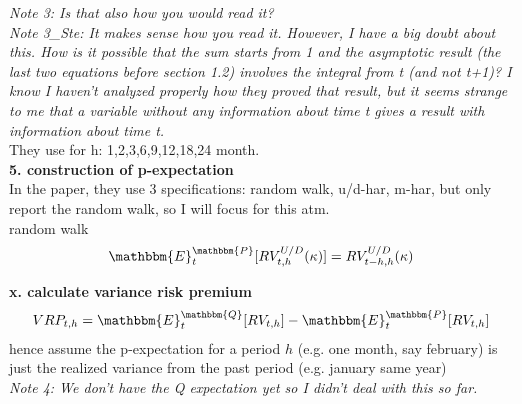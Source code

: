 \documentclass{article}
\begin{document}
\textit{Note 3: Is that also how you would read it?}\\

\textit{Note 3\_Ste: It makes sense how you read it. However, I have a big doubt about this. How is it possible that the sum starts from 1 and the asymptotic result (the last two equations before section 1.2) involves the integral from t (and not t+1)? I know I haven't analyzed properly how they proved that result, but it seems strange to me that a variable without any information about time t gives a result with information about time t.}\\

They use for h: 1,2,3,6,9,12,18,24 month.\\

\textbf{5. construction of p-expectation}\\

In the paper, they use 3 specifications: random walk, u/d-har, m-har, but only report the random walk, so I will focus for this atm.\\

random walk
\begin{align*}
\mathbbm{E}_{t}^{\mathbbm{P}}[RV_{t,h}^{U/D}(\kappa)] = RV_{t-h,h}^{U/D}(\kappa)
\end{align*}

\textbf{x. calculate variance risk premium}\\
\begin{align*}
VRP_{t,h} = \mathbbm{E}_{t}^{\mathbbm{Q}}[RV_{t,h}] - \mathbbm{E}_{t}^{\mathbbm{P}}[RV_{t,h}]
\end{align*}
hence assume the p-expectation for a period $h$ (e.g. one month, say february) is just the realized variance from the past period (e.g. january same year)\\

\textit{Note 4: We don't have the Q expectation yet so I didn't deal with this so far.}\\
\end{document}
